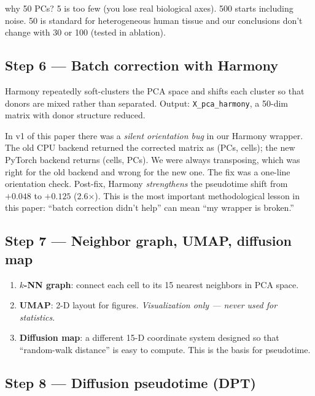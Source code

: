 \documentclass[11pt]{article}
\begin{document}
\begin{jargon}{why 50 PCs?}
5 is too few (you lose real biological axes). 500 starts including noise. 50 is standard for heterogeneous human tissue and our conclusions don't change with 30 or 100 (tested in ablation).
\end{jargon}

\subsection{Step 6 --- Batch correction with Harmony}

Harmony repeatedly soft-clusters the PCA space and shifts each cluster so that donors are mixed rather than separated. Output: \texttt{X\_pca\_harmony}, a 50-dim matrix with donor structure reduced.

\begin{pitfall}
In v1 of this paper there was a \emph{silent orientation bug} in our Harmony wrapper. The old CPU backend returned the corrected matrix as (PCs, cells); the new PyTorch backend returns (cells, PCs). We were always transposing, which was right for the old backend and wrong for the new one. The fix was a one-line orientation check. Post-fix, Harmony \emph{strengthens} the pseudotime shift from $+0.048$ to $+0.125$ (2.6$\times$). This is the most important methodological lesson in this paper: ``batch correction didn't help'' can mean ``my wrapper is broken.''
\end{pitfall}

\subsection{Step 7 --- Neighbor graph, UMAP, diffusion map}

\begin{enumerate}
\item \textbf{$k$-NN graph}: connect each cell to its 15 nearest neighbors in PCA space.
\item \textbf{UMAP}: 2-D layout for figures. \emph{Visualization only --- never used for statistics.}
\item \textbf{Diffusion map}: a different 15-D coordinate system designed so that ``random-walk distance'' is easy to compute. This is the basis for pseudotime.
\end{enumerate}

\subsection{Step 8 --- Diffusion pseudotime (DPT)}
\end{document}
